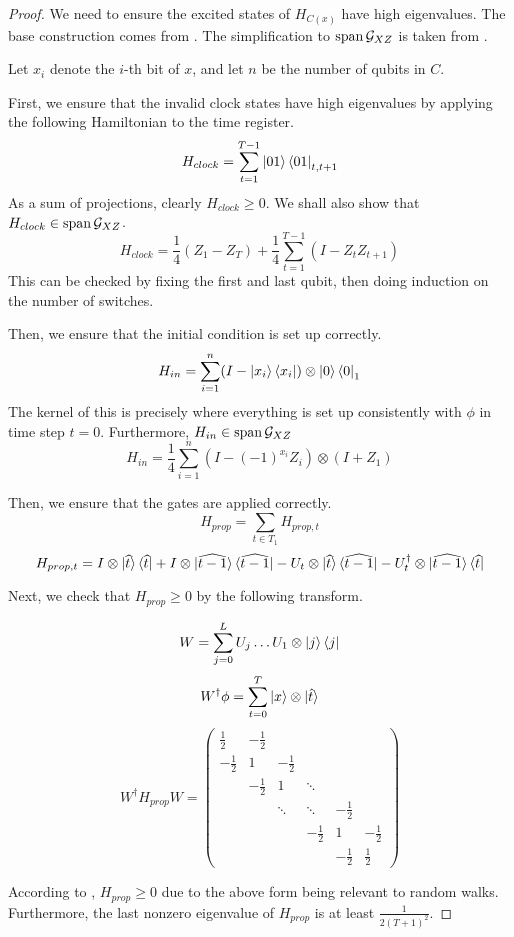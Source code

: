 \begin{proof}
	We need to ensure the excited states of $H_{C(x)}$ have high eigenvalues. The base construction comes from \cite{kitaev2002classical}. The simplification to $\operatorname*{\operatorname{span}}\mathcal{G}_{XZ}$ is taken from \cite{PhysRevA.78.012352}.

	Let $x_i$ denote the $i$-th bit of $x$, and let $n$ be the number of qubits in $C$.

	First, we ensure that the invalid clock states have high eigenvalues by applying the following Hamiltonian to the time register.
	$$H_{clock}=\sum_{t=1}^{T-1}\ket{01}\bra{01}_{t,t+1}$$
	As a sum of projections, clearly $H_{clock}\geq 0$. We shall also show that $H_{clock}\in\operatorname*{\operatorname{span}}\mathcal{G}_{XZ}$.
	$$H_{clock}=\frac{1}{4}(Z_1 - Z_T) + \frac{1}{4}\sum_{t=1}^{T-1}(I-Z_tZ_{t+1}) $$
	This can be checked by fixing the first and last qubit, then doing induction on the number of switches.

	Then, we ensure that the initial condition is set up correctly.
	$$H_{in}=\sum_{i=1}^n(I-\ket{x_i}\bra{x_i})\otimes\ket{0}\bra{0}_1$$
	The kernel of this is precisely where everything is set up consistently with $\phi$ in time step $t=0$. Furthermore, $H_{in}\in\operatorname*{\operatorname{span}}\mathcal{G}_{XZ}$
	$$H_{in}=\frac{1}{4}\sum_{i=1}^n(I-(-1)^{x_i}Z_i)\otimes(I+Z_1)$$

	Then, we ensure that the gates are applied correctly.
	$$H_{prop}=\sum_{t\in T_1}H_{prop,t}$$
	$$H_{prop,t}=I\otimes\ket{\widehat{t}}\bra{\widehat{t}}
	+I\otimes\ket{\widehat{t-1}}\bra{\widehat{t-1}}
	-U_t\otimes\ket{\widehat{t}}\bra{\widehat{t-1}}
	-U_t^\dagger\otimes\ket{\widehat{t-1}}\bra{\widehat{t}}$$

	Next, we check that $H_{prop}\geq0$ by the following transform.

	$$W=\sum_{j=0}^L U_j\ldots U_1\otimes\ket{j}\bra{j}$$
	$$W^\dagger\phi=\sum_{t=0}^T\ket{x}\otimes\ket{\hat{t}}$$
	$$W^\dagger H_{prop} W=
	\begin{pmatrix}
		\frac{1}{2} & -\frac{1}{2} & & & &  \\
		-\frac{1}{2} & 1 & -\frac{1}{2} & & & \\
		& -\frac{1}{2} & 1 & \ddots & & \\
		& & \ddots & \ddots & -\frac{1}{2} & \\
		& & & -\frac{1}{2} & 1 & -\frac{1}{2} \\
		& & & & -\frac{1}{2} & \frac{1}{2}
	\end{pmatrix}$$

	According to \cite{2002quant.ph.10077A}, $H_{prop}\geq 0$ due to the above form being relevant to random walks. Furthermore, the last nonzero eigenvalue of $H_{prop}$ is at least $\frac{1}{2(T+1)^2}$.


\end{proof}
